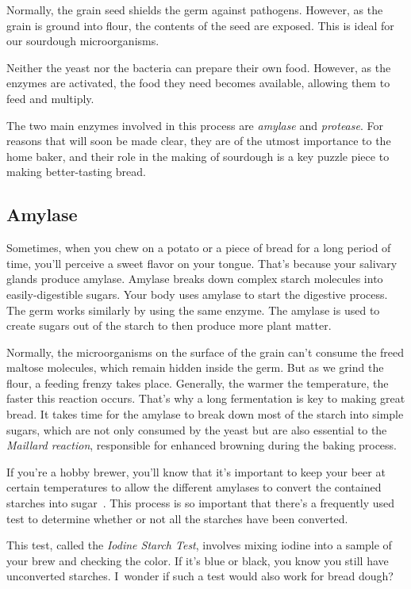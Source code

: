 Normally, the grain seed shields the germ against pathogens. However, as the
grain is ground into flour, the contents of the seed are exposed. This is ideal
for our sourdough microorganisms.

Neither the yeast nor the bacteria can prepare their own food. However, as
the enzymes are activated, the food they need becomes available, allowing them
to feed and multiply.

The two main enzymes involved in this process are \emph{amylase} and
\emph{protease}. For reasons that will soon be made clear, they are of the
utmost importance to the home baker, and their role in the making of sourdough
is a key puzzle piece to making better-tasting bread.

\subsection{Amylase}

Sometimes, when you chew on a potato or a piece of bread for a long period
of time, you'll perceive a sweet flavor on your tongue. That's because your
salivary glands produce amylase. Amylase breaks down complex starch molecules
into easily-digestible sugars. Your body uses amylase to start the digestive
process. The germ works similarly by using the same enzyme. The amylase
is used to create sugars out of the starch to then produce more plant matter.

Normally,
the microorganisms on the surface of the grain can't consume the freed maltose
molecules, which remain hidden inside the germ. But as we grind the flour, a
feeding frenzy takes place. Generally, the warmer the temperature, the faster
this reaction occurs. That's why a long fermentation is key to making great
bread. It takes time for the amylase to break down most of the starch into
simple sugars, which are not only consumed by the yeast but are also essential
to the \emph{Maillard reaction}, responsible for enhanced browning during the
baking process.

If you're a hobby brewer, you'll know that it's important to keep your beer at
certain temperatures to allow the different amylases to convert the contained
starches into sugar~\cite{beer+amylase}. This process is so important that
there's a frequently used test to determine whether or not all the starches
have been converted.

This test, called the \emph{Iodine Starch Test}, involves mixing iodine into
a sample of your brew and checking the color. If it's blue or black, you know
you still have unconverted starches. I~wonder if such a test would also work
for bread dough?

